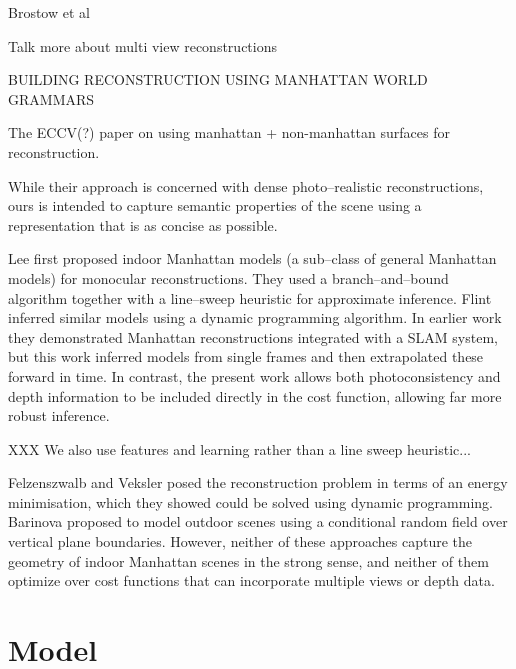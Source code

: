 \documentclass{article}
\begin{document}
Brostow et al

Talk more about multi view reconstructions

BUILDING RECONSTRUCTION USING MANHATTAN WORLD GRAMMARS

The ECCV(?) paper on using manhattan + non-manhattan surfaces for
reconstruction.

While their approach is concerned with dense photo--realistic
reconstructions, ours is intended to capture semantic properties of
the scene using a representation that is as concise as possible.

Lee \etal \cite{Lee09} first proposed indoor Manhattan models (a
sub--class of general Manhattan models) for monocular
reconstructions. They used a branch--and--bound algorithm together
with a line--sweep heuristic for approximate inference. Flint \etal
\cite{Flint10ECCV} inferred similar models using a dynamic programming
algorithm. In earlier work \cite{Flint10CVPR} they demonstrated
Manhattan reconstructions integrated with a SLAM system, but this work
inferred models from single frames and then extrapolated these forward
in time. In contrast, the present work allows both photoconsistency
and depth information to be included directly in the cost function,
allowing far more robust inference.

XXX We also use features and learning rather than a line sweep heuristic...

Felzenszwalb and Veksler \cite{Felzenszwalb10} posed the
reconstruction problem in terms of an energy minimisation, which they
showed could be solved using dynamic programming. Barinova \etal
\cite{Barinova08} proposed to model outdoor scenes using a conditional
random field over vertical plane boundaries. However, neither of these
approaches capture the geometry of indoor Manhattan scenes in the
strong sense, and neither of them optimize over cost functions that
can incorporate multiple views or depth data.

\section{Model}
\end{document}
